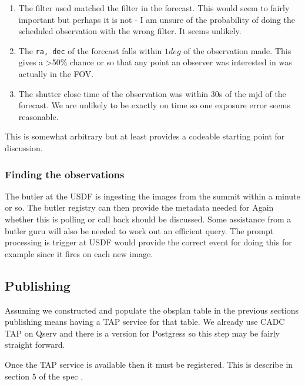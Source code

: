\begin{enumerate}
\item The filter used matched the filter in the forecast.
This would seem to fairly important but perhaps it is not - I am unsure of the probability of
doing the scheduled observation with the wrong filter. It seems unlikely.
\item The \texttt {ra, dec} of the forecast falls within $1 deg$ of the observation made.
This gives a >50\% chance or so that any point an observer was interested in was actually in the FOV.
\item The shutter close time of the observation was within 30s of the mjd of the forecast.
We are unlikely to be exactly on time so one exposure error seems reasonable.
\end{enumerate}

This is somewhat arbitrary but at least provides a codeable starting point for discussion.

\subsubsection{Finding the observations}
The butler at the USDF is ingesting the images from the summit within a minute or so.
The butler registry can then provide the metadata needed for  
Again whether this is polling or call back should be discussed.
Some assistance from  a butler guru will also be needed to work out an efficient query.
The prompt processing is trigger at USDF would provide the correct event for doing this for example since it fires on each new image.

\subsection{Publishing}
Assuming we constructed and populate the obsplan table in the previous sections publishing means having a TAP service for that table.
We already use CADC TAP on Qserv and there is a version for Postgress so this step may be fairly straight forward.

Once the TAP service is available then it must be registered.
This is describe in section 5 of the spec \citep{2021ivoa.spec.0724S}.
